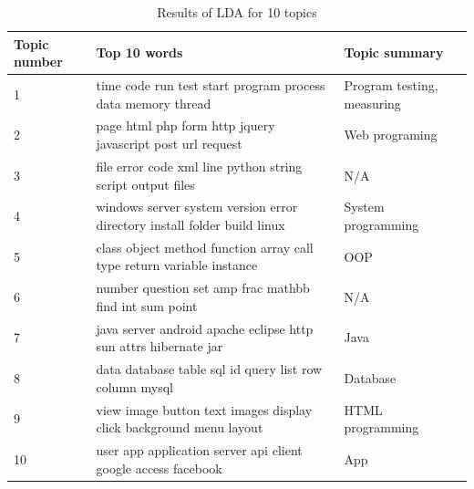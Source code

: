\documentclass[conference]{IEEEtran}
\begin{document}
\begin{table}[!t]
\caption{Results of LDA for 10 topics}
\label{result1}
\centering
  \begin{tabular}{ l  l  l }
    \hline
    Topic number & Top 10 words & Topic summary \\ \hline
    1 & time code run test start program process data memory thread & Program testing, measuring \\ 
    2 & page html php form http jquery javascript post url request & Web programing \\ 
    3 & file error code xml line python string script output files  & N/A \\ 
    4 & windows server system version error directory install folder build linux & System programming \\ 
    5 & class object method function array call type return variable instance & OOP \\ 
    6 & number question set amp frac mathbb find int sum point & N/A \\ 
    7 & java server android apache eclipse http sun attrs hibernate jar & Java \\ 
    8 & data database table sql id query list row column mysql & Database \\ 
    9 & view image button text images display click background menu layout & HTML programming \\ 
    10 & user app application server api client google access facebook & App \\
    \hline
  \end{tabular}
\end{table}
\end{document}
